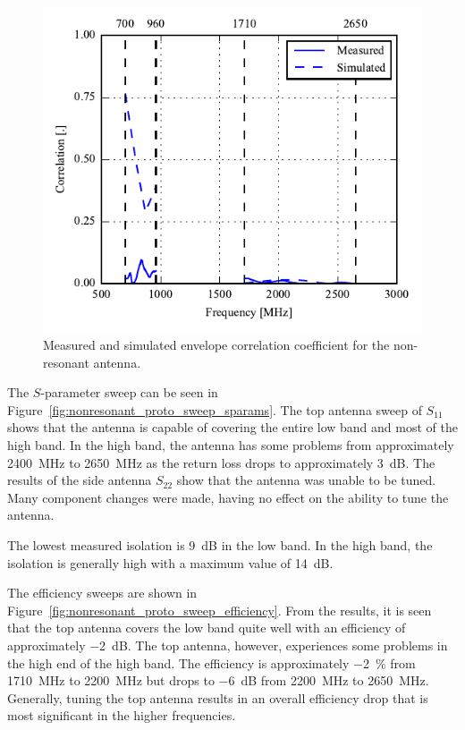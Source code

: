 \begin{figure}[htbp]
    \centering
    \includegraphics{img/tech_sol/nonresonant/prototype/correlation.pdf}
    \caption{Measured and simulated envelope correlation coefficient for the non-resonant antenna.}
    \label{fig:nonresonant_proto_ecc}
\end{figure}

\FloatBarrier
The $S$-parameter sweep can be seen in Figure~\ref{fig:nonresonant_proto_sweep_sparams}. The top antenna sweep of $S_{11}$ shows that the antenna is capable of covering the entire low band and most of the high band. In the high band, the antenna has some problems from approximately \SI{2400}{MHz} to \SI{2650}{MHz} as the return loss drops to approximately \SI{3}{dB}. The results of the side antenna $S_{22}$ show that the antenna was unable to be tuned. Many component changes were made, having no effect on the ability to tune the antenna. 

The lowest measured isolation is \SI{9}{dB} in the low band. In the high band, the isolation is generally high with a maximum value of \SI{14}{dB}. 

The efficiency sweeps are shown in Figure~\ref{fig:nonresonant_proto_sweep_efficiency}. From the results, it is seen that the top antenna covers the low band quite well with an efficiency of approximately \SI{-2}{dB}. The top antenna, however, experiences some problems in the high end of the high band. The efficiency is approximately \SI{-2}{\percent} from \SI{1710}{MHz} to \SI{2200}{MHz} but drops to \SI{-6}{dB} from \SI{2200}{MHz} to \SI{2650}{MHz}. Generally, tuning the top antenna results in an overall efficiency drop that is most significant in the higher frequencies.

